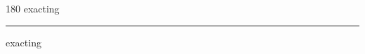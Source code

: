 
\begin{frame}
\begin{center}
\begin{turn}{180}
{\fontsize{2.5cm}{1em}\selectfont exacting}
\end{turn}
\vspace{1em}\par  
\hrule
\vspace{1em}\par  
{\fontsize{2.5cm}{1em}\selectfont exacting}
\end{center}
\end{frame}
